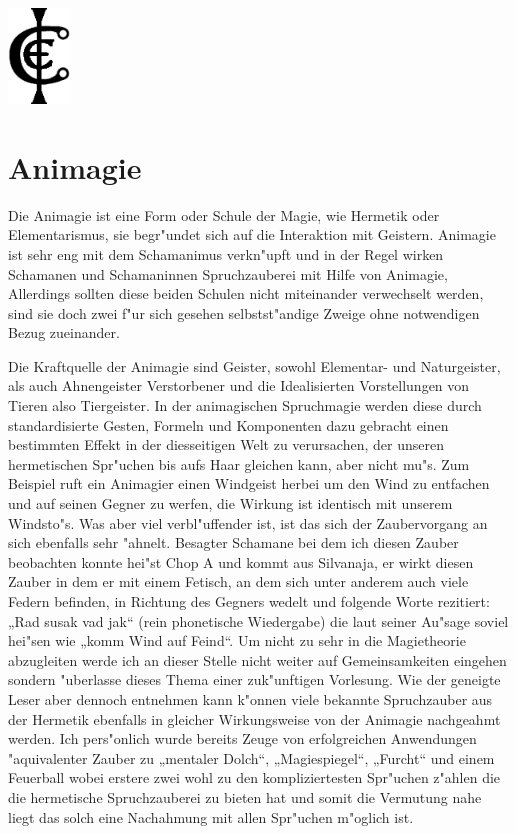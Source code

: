 \documentclass[a5paper,8pt]{book}
\begin{document}
\begin{flushright}
\includegraphics[height=1in]{pictures/Cordo_Siegel.png}
\end{flushright}

\newpage

\section{Animagie}

Die Animagie ist eine Form oder Schule der Magie, wie Hermetik oder Elementarismus, sie begr"undet sich auf die Interaktion mit Geistern. 
Animagie ist sehr eng mit dem Schamanimus verkn"upft und in der Regel wirken Schamanen und Schamaninnen Spruchzauberei mit Hilfe von Animagie, 
Allerdings sollten diese beiden Schulen nicht miteinander verwechselt werden, sind sie doch zwei f"ur sich gesehen selbstst"andige 
Zweige ohne notwendigen Bezug zueinander.

Die Kraftquelle der Animagie sind Geister, sowohl Elementar- und Naturgeister, als auch Ahnengeister Verstorbener und die Idealisierten 
Vorstellungen von Tieren also Tiergeister. In der animagischen Spruchmagie werden diese durch standardisierte Gesten, Formeln 
und Komponenten dazu gebracht einen bestimmten Effekt in der diesseitigen Welt zu verursachen, der unseren hermetischen Spr"uchen 
bis aufs Haar gleichen kann, aber nicht mu"s. Zum Beispiel ruft ein Animagier einen Windgeist herbei um den Wind zu entfachen und auf 
seinen Gegner zu werfen, die Wirkung ist identisch mit unserem Windsto"s. Was aber viel verbl"uffender ist, ist das sich der Zaubervorgang 
an sich ebenfalls sehr "ahnelt. Besagter Schamane bei dem ich diesen Zauber beobachten konnte hei"st Chop A und kommt aus Silvanaja, er 
wirkt diesen Zauber in dem er mit einem Fetisch, an dem sich unter anderem auch viele Federn befinden, in Richtung des Gegners wedelt und 
folgende Worte rezitiert: „Rad susak vad jak“ (rein phonetische Wiedergabe) die laut 
seiner Au"sage soviel hei"sen wie „komm Wind auf Feind“. Um nicht zu sehr in die Magietheorie abzugleiten werde ich an dieser Stelle nicht 
weiter auf Gemeinsamkeiten eingehen sondern "uberlasse dieses Thema einer zuk"unftigen Vorlesung. Wie der geneigte Leser aber dennoch entnehmen 
kann k"onnen viele bekannte Spruchzauber aus der Hermetik ebenfalls in gleicher Wirkungsweise von der Animagie nachgeahmt werden. Ich pers"onlich 
wurde bereits Zeuge von erfolgreichen Anwendungen "aquivalenter Zauber zu „mentaler Dolch“, „Magiespiegel“, „Furcht“ und einem Feuerball wobei 
erstere zwei wohl zu den kompliziertesten Spr"uchen z"ahlen die die hermetische Spruchzauberei zu bieten hat und somit die Vermutung nahe liegt 
das solch eine Nachahmung mit allen Spr"uchen m"oglich ist.
\end{document}
